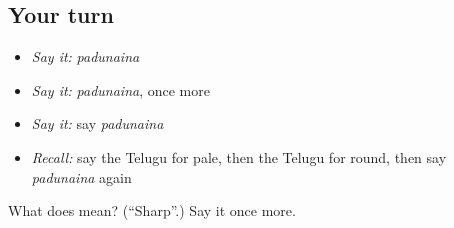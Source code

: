 \subsection*{Your turn}
\begin{itemize}
\raggedright
  \item \emph{Say it:} \emph{padunaina}
  \item \emph{Say it:} \emph{padunaina}, once more
  \item \emph{Say it:} say \emph{padunaina}
  \item \emph{Recall:} say the Telugu for pale, then the Telugu for round, then say \emph{padunaina} again
\end{itemize}

\begin{tcolorbox}[breakable,colback=teal!4,colframe=teal!35!black,title={Before you move on}]
What does  mean? (\textquotedblleft{}Sharp\textquotedblright{}.) Say it once more.
\end{tcolorbox}
